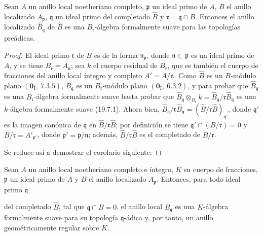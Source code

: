 \begin{theorem}[22.3.3]
\label{0.22.3.3-fr}
Sean $A$ un anillo local noetheriano \textup{completo}, $\mathfrak p$ un ideal primo
de $A$, $B$ el anillo localizado $A_\mathfrak p$, $\mathfrak q$ un ideal
primo del completado $\widehat B$ y $\mathfrak r=\mathfrak q\cap B$.
Entonces el anillo localizado $\widehat B_\mathfrak q$ de $\widehat B$ es una
$B_\mathfrak r$-álgebra formalmente suave para las topologías preádicas.
\end{theorem}

\begin{proof}
El ideal primo $\mathfrak r$ de $B$ es de la forma
$\mathfrak n_\mathfrak p$, donde $\mathfrak n\subset\mathfrak p$ es un ideal
primo de $A$, y se tiene $B_\mathfrak r=A_\mathfrak n$; sea $k$ el cuerpo
residual de $B_\mathfrak r$, que es también el cuerpo de fracciones del anillo
local íntegro y completo $A'=A/\mathfrak n$. Como $\widehat B$ es un
$B$-módulo plano $(\mathbf 0_\mathrm I,~7.3.5)$,
$\widehat B_\mathfrak q$ es un $B_\mathfrak r$-módulo plano
$(\mathbf 0_\mathrm I,~6.3.2)$, y para probar que
$\widehat B_\mathfrak q$ es una $B_\mathfrak r$-álgebra formalmente suave
basta probar que
$\widehat B_\mathfrak q\otimes_{B_\mathfrak r}k=\widehat B_\mathfrak q/\mathfrak r\widehat B_\mathfrak q$
es una $k$-álgebra formalmente suave (19.7.1). Ahora bien,
$\widehat B_\mathfrak q/\mathfrak r\widehat B_\mathfrak q
=(\widehat B/\mathfrak r\widehat B)_{\mathfrak q'}$, donde $\mathfrak q'$ es
la imagen canónica de $\mathfrak q$ en
$\widehat B/\mathfrak r\widehat B$; por definición se tiene
$\mathfrak q'\cap(B/\mathfrak r)=0$ y
$B/\mathfrak r=A'_{\mathfrak p'}$, donde
$\mathfrak p'=\mathfrak p/\mathfrak n$; además,
$\widehat B/\mathfrak r\widehat B$ es el completado de $B/\mathfrak r$.

Se reduce así a demostrar el corolario siguiente:
\end{proof}

\begin{corollary}[22.3.4]
\label{0.22.3.4-fr}
Sean $A$ un anillo local noetheriano \textup{completo} e íntegro, $K$ su cuerpo de
fracciones, $\mathfrak p$ un ideal primo de $A$ y $B$ el anillo localizado
$A_\mathfrak p$. Entonces, para todo ideal primo $\mathfrak q$


del completado $\widehat B$, tal que $\mathfrak q\cap B=0$, el anillo local
$\widehat B_\mathfrak q$ es una $K$-álgebra formalmente suave para su topología
$\mathfrak q$-ádica y, por tanto, un anillo geométricamente regular sobre
$K$.
\end{corollary}

